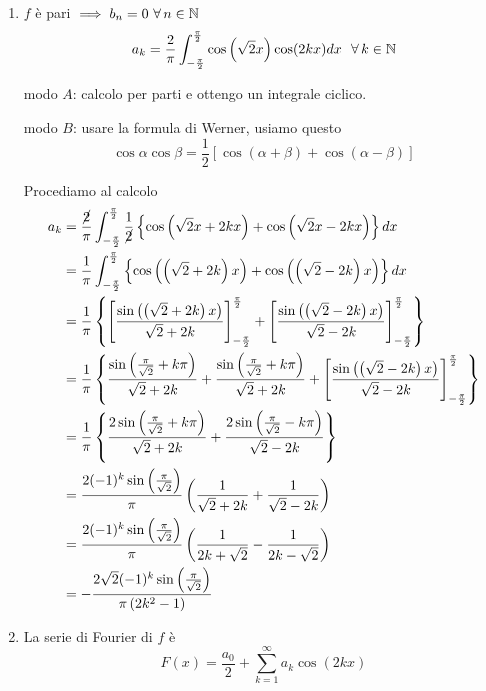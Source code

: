 \begin{enumerate}
\item $f$ è pari $\implies b_{n} = 0\ \forall n\in \NN $
\begin{equation*}
a_{k} = \frac{2}{\pi}\int^{\frac{\pi}{2}}_{- \frac{\pi}{2}}\cos\left(\sqrt{2} x\right)\cos(2kx) dx\ \ \forall k\in \NN
\end{equation*}

modo $A$: calcolo per parti e ottengo un integrale ciclico.

modo $B$: usare la formula di Werner, usiamo questo
\begin{equation*}
\cos \alpha \cos \beta = \frac{1}{2}[\cos(\alpha + \beta) + \cos(\alpha - \beta)]
\end{equation*}

Procediamo al calcolo
\begin{align*}
a_{k} & = \frac{\cancel{2}}{\pi}\int^{\frac{\pi}{2}}_{- \frac{\pi}{2}}\frac{1}{\cancel{2}}\left\{\cos\left(\sqrt{2} x + 2kx\right) + \cos\left(\sqrt{2} x - 2kx\right)\right\} dx\\
 & = \frac{1}{\pi}\int^{\frac{\pi}{2}}_{- \frac{\pi}{2}}\left\{\cos\left(\left(\sqrt{2} + 2k\right) x\right) + \cos\left(\left(\sqrt{2} - 2k\right) x\right)\right\} dx\\
 & = \frac{1}{\pi}\left\{\left[\frac{\sin\left(\left(\sqrt{2} + 2k\right) x\right)}{\sqrt{2} + 2k}\right]^{\frac{\pi}{2}}_{- \frac{\pi}{2}} + \left[\frac{\sin\left(\left(\sqrt{2} - 2k\right) x\right)}{\sqrt{2} - 2k}\right]^{\frac{\pi}{2}}_{- \frac{\pi}{2}}\right\}\\
 & = \frac{1}{\pi}\left\{\frac{\sin\left(\frac{\pi}{\sqrt{2}} + k\pi \right)}{\sqrt{2} + 2k} + \frac{\sin\left(\frac{\pi}{\sqrt{2}} + k\pi \right)}{\sqrt{2} + 2k} + \left[\frac{\sin\left(\left(\sqrt{2} - 2k\right) x\right)}{\sqrt{2} - 2k}\right]^{\frac{\pi}{2}}_{- \frac{\pi}{2}}\right\}\\
 & = \frac{1}{\pi}\left\{\frac{2\sin\left(\frac{\pi}{\sqrt{2}} + k\pi \right)}{\sqrt{2} + 2k} + \frac{2\sin\left(\frac{\pi}{\sqrt{2}} - k\pi \right)}{\sqrt{2} - 2k}\right\}\\
 & = \frac{2(- 1)^{k}\sin\left(\frac{\pi}{\sqrt{2}}\right)}{\pi}\left(\frac{1}{\sqrt{2} + 2k} + \frac{1}{\sqrt{2} - 2k}\right)\\
 & = \frac{2(- 1)^{k}\sin\left(\frac{\pi}{\sqrt{2}}\right)}{\pi}\left(\frac{1}{2k + \sqrt{2}} - \frac{1}{2k - \sqrt{2}}\right)\\
 & = - \frac{2\sqrt{2}(- 1)^{k}\sin\left(\frac{\pi}{\sqrt{2}}\right)}{\pi \left(2k^{2} - 1\right)}
\end{align*}
\item La serie di Fourier di $f$ è
\begin{equation*}
F(x) = \frac{a_{0}}{2} + \sum\limits^{\infty}_{k = 1} a_{k}\cos(2kx)
\end{equation*}


\end{enumerate}
